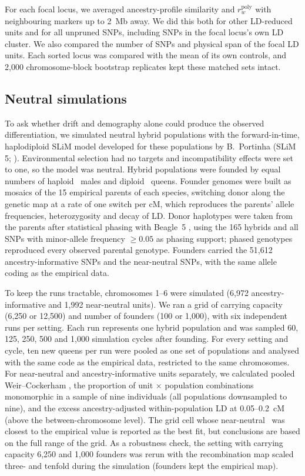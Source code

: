 For each focal locus, we averaged ancestry-profile similarity and $r_w^{\mathrm{poly}}$ with neighbouring markers up to 2~Mb away. We did this both for other LD-reduced units and for all unpruned SNPs, including SNPs in the focal locus's own LD cluster. We also compared the number of SNPs and physical span of the focal LD units. Each sorted locus was compared with the mean of its own controls, and 2,000 chromosome-block bootstrap replicates kept these matched sets intact.

\subsection{Neutral simulations}

To ask whether drift and demography alone could produce the observed differentiation, we simulated neutral hybrid populations with the forward-in-time, haplodiploid SLiM model developed for these populations by B.~Portinha (SLiM 5; \citealp{haller2023slim}). Environmental selection had no targets and incompatibility effects were set to one, so the model was neutral. Hybrid populations were founded by equal numbers of haploid \Fa\ males and diploid \Fp\ queens. Founder genomes were built as mosaics of the 15 empirical parents of each species, switching donor along the genetic map at a rate of one switch per cM, which reproduces the parents' allele frequencies, heterozygosity and decay of LD. Donor haplotypes were taken from the parents after statistical phasing with Beagle~5 \citep{browning2021fast}, using the 165 hybrids and all SNPs with minor-allele frequency $\geq0.05$ as phasing support; phased genotypes reproduced every observed parental genotype. Founders carried the 51,612 ancestry-informative SNPs and the near-neutral SNPs, with the same allele coding as the empirical data.

To keep the runs tractable, chromosomes 1--6 were simulated (6,972 ancestry-informative and 1,992 near-neutral units). We ran a grid of carrying capacity (6,250 or 12,500) and number of founders (100 or 1,000), with six independent runs per setting. Each run represents one hybrid population and was sampled 60, 125, 250, 500 and 1,000 simulation cycles after founding. For every setting and cycle, ten new queens per run were pooled as one set of populations and analysed with the same code as the empirical data, restricted to the same chromosomes. For near-neutral and ancestry-informative units separately, we calculated pooled Weir--Cockerham \FST, the proportion of unit $\times$ population combinations monomorphic in a sample of nine individuals (all populations downsampled to nine), and the excess ancestry-adjusted within-population LD at 0.05--0.2~cM (above the between-chromosome level). The grid cell whose near-neutral \FST\ was closest to the empirical value is reported as the best fit, but conclusions are based on the full range of the grid. As a robustness check, the setting with carrying capacity 6,250 and 1,000 founders was rerun with the recombination map scaled three- and tenfold during the simulation (founders kept the empirical map).
